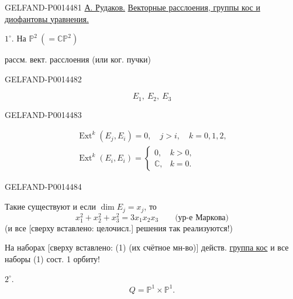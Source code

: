 \begin{GelfandAdjacentEvidence}{GELFAND-P001448}{1}
\uline{А. Рудаков.}\quad
\uline{Векторные расслоения, группы кос и диофантовы уравнения.}

\(1^{\circ}\). На \(\mathbb{P}^{2}\ (= \mathbb{C}\mathbb{P}^{2})\)

рассм. вект. расслоения (или ког. пучки)
\end{GelfandAdjacentEvidence}
\begin{GelfandAdjacentEvidence}{GELFAND-P001448}{2}

\begin{equation*}
E_1,\ E_2,\ E_3 \tag{1}
\end{equation*}
\end{GelfandAdjacentEvidence}
\begin{GelfandAdjacentEvidence}{GELFAND-P001448}{3}

\begin{equation*}
\begin{gathered}
\operatorname{Ext}^{k}(E_j,E_i)=0,\quad j>i,\quad k=0,1,2,\\
\operatorname{Ext}^{k}(E_i,E_i)=
\begin{cases}
0,& k>0,\\
\mathbb{C},& k=0.
\end{cases}
\end{gathered}
\tag{2}
\end{equation*}
\end{GelfandAdjacentEvidence}
\begin{GelfandAdjacentEvidence}{GELFAND-P001448}{4}


Такие существуют и если \(\dim E_j=x_j\), то
\begin{equation*}
x_1^2+x_2^2+x_3^2=3x_1x_2x_3
\qquad\text{(ур-е Маркова)} \tag{3}
\end{equation*}
(и все [сверху вставлено: целочисл.] решения так реализуются!)

На наборах [сверху вставлено: (1) (их счётное мн-во)] действ. \uline{группа кос} и все наборы (1) сост. 1 орбиту!

\(2^{\circ}\).
\begin{equation*}
Q=\mathbb{P}^{1}\times\mathbb{P}^{1}.
\end{equation*}
\end{GelfandAdjacentEvidence}

